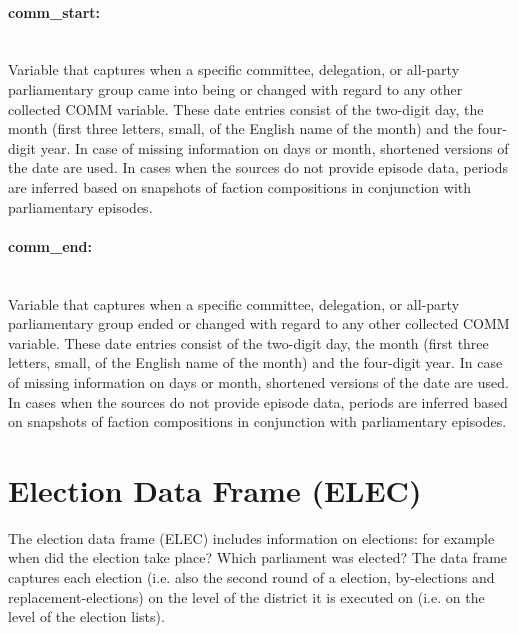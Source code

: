 \documentclass{article}
\begin{document}
\paragraph{comm\_start:}\\
   Variable that captures when a specific committee, delegation, or all-party parliamentary group came into being or changed with regard to any other collected COMM variable. These date entries consist of the two-digit day, the month (first three letters, small, of the English name of the month) and the four-digit year. In case of missing information on days or month, shortened versions of the date are used. In cases when the sources do not provide episode data, periods are inferred based on snapshots of faction compositions in conjunction with parliamentary episodes.
    
\paragraph{comm\_end:}\\
    Variable that captures when a specific committee, delegation, or all-party parliamentary group ended or changed with regard to any other collected COMM variable. These date entries consist of the two-digit day, the month (first three letters, small, of the English name of the month) and the four-digit year. In case of missing information on days or month, shortened versions of the date are used. In cases when the sources do not provide episode data, periods are inferred based on snapshots of faction compositions in conjunction with parliamentary episodes.
\section{Election Data Frame (\gls{ELEC})}\label{ELEC}

    The election data frame (\gls{ELEC}) includes information on elections: for example when did the election take place? Which parliament was elected? The data frame captures each election (i.e. also the second round of a election, by-elections and replacement-elections) on the level of the district it is executed on (i.e. on the level of the election lists). 
    
    
    
\end{document}
